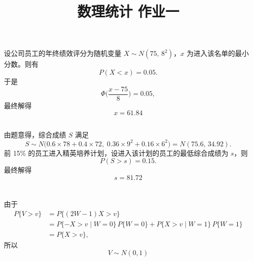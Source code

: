 \documentclass[12pt,a4paper]{article}
\title{\textbf{数理统计 \quad 作业一}}
\author{}
\date{}
\begin{document}
\maketitle
\thispagestyle{fancy}

\section{}

\subsection{}

设公司员工的年终绩效评分为随机变量 $X\sim N(75,\,8^{2})$，$x$ 为进入该名单的最小分数。则有
\[
  P(X<x)=0.05.
\]
于是
\[
  \Phi\!\biggl(\frac{x-75}{8}\biggr)=0.05,
\]
最终解得
\[
  \boxed{x=61.84}
\]

\subsection{}

由题意得，综合成绩 $S$ 满足
\[
  S\sim N\!\bigl(0.6\times78+0.4\times72,\;0.36\times9^{2}+0.16\times6^{2}\bigr)
  =N(75.6,\,34.92).
\]
前 15\% 的员工进入精英培养计划，设进入该计划的员工的最低综合成绩为 $s$，则
\[
  P(S>s)=0.15.
\]
最终解得
\[
  \boxed{s=81.72}
\]

\section{}

\subsection{}

由于
\begin{align*}
  P\{V>v\}
  &=P\{(2W-1)X>v\}\\
  &=P\{-X>v\mid W=0\}\,P\{W=0\}
   +P\{X>v\mid W=1\}\,P\{W=1\}\\
  &=P\{X>v\},
\end{align*}
所以
\[
  \boxed{V\sim N(0,1)}
\]

\subsection{}
\end{document}

